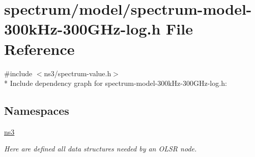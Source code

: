 \hypertarget{spectrum-model-300kHz-300GHz-log_8h}{}\section{spectrum/model/spectrum-\/model-\/300k\+Hz-\/300\+G\+Hz-\/log.h File Reference}
\label{spectrum-model-300kHz-300GHz-log_8h}
{\ttfamily \#include $<$ns3/spectrum-\/value.\+h$>$}\\*
Include dependency graph for spectrum-\/model-\/300k\+Hz-\/300\+G\+Hz-\/log.h\+:
\subsection*{Namespaces}
\begin{DoxyCompactItemize}
\item 
 \hyperlink{namespacens3}{ns3}
\begin{DoxyCompactList}\small\item\em Here are defined all data structures needed by an O\+L\+SR node. \end{DoxyCompactList}\end{DoxyCompactItemize}
